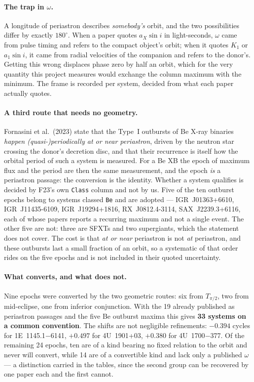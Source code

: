 \documentclass[10pt,a4paper]{article}
\begin{document}
\paragraph{The trap in $\omega$.} A longitude of periastron describes
\emph{somebody's} orbit, and the two possibilities differ by exactly
$180^{\circ}$. When a paper quotes $a_{X}\sin i$ in light-seconds, $\omega$ came
from pulse timing and refers to the compact object's orbit; when it quotes
$K_{1}$ or $a_{1}\sin i$, it came from radial velocities of the companion and
refers to the donor's. Getting this wrong displaces phase zero by half an
orbit, which for the very quantity this project measures would exchange the
column maximum with the minimum. The frame is recorded per system, decided from
what each paper actually quotes.

\paragraph{A third route that needs no geometry.} Fornasini et al.\ (2023)
state that the Type~I outbursts of Be X-ray binaries \emph{happen
(quasi-)periodically at or near periastron}, driven by the neutron star
crossing the donor's decretion disc, and that their recurrence is itself how
the orbital period of such a system is measured. For a Be XB the epoch of
maximum flux and the period are then the same measurement, and the epoch
\emph{is} a periastron passage: the conversion is the identity. Whether a
system qualifies is decided by F23's own \texttt{Class} column and not by us.
Five of the ten outburst epochs belong to systems classed \texttt{Be} and are
adopted --- IGR~J01363+6610, IGR~J11435-6109, IGR~J19294+1816,
RX~J0812.4-3114, SAX~J2239.3+6116, each of whose papers reports a recurring
maximum and not a single event. The other five are not: three are SFXTs and two
supergiants, which the statement does not cover. The cost is that \emph{at or
near} periastron is not \emph{at} periastron, and these outbursts last a small
fraction of an orbit, so a systematic of that order rides on the five epochs
and is not included in their quoted uncertainty.

\paragraph{What converts, and what does not.} Nine epochs were converted by the
two geometric routes: six from $T_{\pi/2}$, two from mid-eclipse, one from
inferior conjunction. With the 19 already published as periastron passages and
the five Be outburst maxima this gives \textbf{33 systems on a common
convention}. The shifts are not negligible refinements: $-0.394$ cycles
for 1E~1145.1$-$6141, $+0.497$ for 4U~1901+03, $+0.380$ for 4U~1700$-$377. Of
the remaining 24 epochs, ten are of a kind bearing no fixed relation to the
orbit and never will convert, while 14 are of a convertible kind and lack only
a published $\omega$ --- a distinction carried in the tables, since the second
group can be recovered by one paper each and the first cannot.
\end{document}
